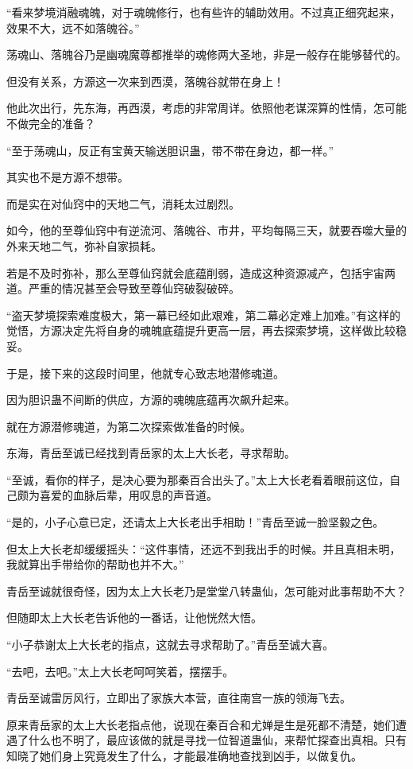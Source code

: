 \begin{this_body}
“看来梦境消融魂魄，对于魂魄修行，也有些许的辅助效用。不过真正细究起来，效果不大，远不如落魄谷。”

荡魂山、落魄谷乃是幽魂魔尊都推举的魂修两大圣地，非是一般存在能够替代的。

但没有关系，方源这一次来到西漠，落魄谷就带在身上！

他此次出行，先东海，再西漠，考虑的非常周详。依照他老谋深算的性情，怎可能不做完全的准备？

“至于荡魂山，反正有宝黄天输送胆识蛊，带不带在身边，都一样。”

其实也不是方源不想带。

而是实在对仙窍中的天地二气，消耗太过剧烈。

如今，他的至尊仙窍中有逆流河、落魄谷、市井，平均每隔三天，就要吞噬大量的外来天地二气，弥补自家损耗。

若是不及时弥补，那么至尊仙窍就会底蕴削弱，造成这种资源减产，包括宇宙两道。严重的情况甚至会导致至尊仙窍破裂破碎。

“盗天梦境探索难度极大，第一幕已经如此艰难，第二幕必定难上加难。”有这样的觉悟，方源决定先将自身的魂魄底蕴提升更高一层，再去探索梦境，这样做比较稳妥。

于是，接下来的这段时间里，他就专心致志地潜修魂道。

因为胆识蛊不间断的供应，方源的魂魄底蕴再次飙升起来。

就在方源潜修魂道，为第二次探索做准备的时候。

东海，青岳至诚已经找到青岳家的太上大长老，寻求帮助。

“至诚，看你的样子，是决心要为那秦百合出头了。”太上大长老看着眼前这位，自己颇为喜爱的血脉后辈，用叹息的声音道。

“是的，小子心意已定，还请太上大长老出手相助！”青岳至诚一脸坚毅之色。

但太上大长老却缓缓摇头：“这件事情，还远不到我出手的时候。并且真相未明，我就算出手带给你的帮助也并不大。”

青岳至诚就很奇怪，因为太上大长老乃是堂堂八转蛊仙，怎可能对此事帮助不大？

但随即太上大长老告诉他的一番话，让他恍然大悟。

“小子恭谢太上大长老的指点，这就去寻求帮助了。”青岳至诚大喜。

“去吧，去吧。”太上大长老呵呵笑着，摆摆手。

青岳至诚雷厉风行，立即出了家族大本营，直往南宫一族的领海飞去。

原来青岳家的太上大长老指点他，说现在秦百合和尤婵是生是死都不清楚，她们遭遇了什么也不明了，最应该做的就是寻找一位智道蛊仙，来帮忙探查出真相。只有知晓了她们身上究竟发生了什么，才能最准确地查找到凶手，以做复仇。


\end{this_body}
